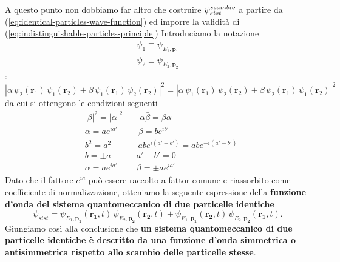A questo punto non dobbiamo far altro che costruire $ \mathlarger{\psi}^{scambio}_{sist}$
a partire da (\ref{eq:identical-particles-wave-function}) ed imporre la validità di (\ref{eq:indistinguishable-particles-principle})\sidenote
{
Introduciamo la notazione
\begin{gather*}
    \psi_1 \equiv \psi_{E_1,\bm{p}_1} \\
    \psi_2 \equiv \psi_{E_2,\bm{p}_2}
\end{gather*}
}:
\[
    |\alpha\, \psi_2(\bm{r}_1)\,\psi_1(\bm{r}_2) + \beta\, \psi_1(\bm{r}_1)\,\psi_2(\bm{r}_2)|^2 =
    |\alpha\, \psi_1(\bm{r}_1)\,\psi_2(\bm{r}_2) + \beta\, \psi_2(\bm{r}_1)\,\psi_1(\bm{r}_2)|^2
\]
da cui si ottengono le condizioni seguenti
\begin{align*}
    &|\beta|^{2} = |\alpha|^{2} \qquad \alpha \bar{\beta} = \beta \bar{\alpha}  \\
    &\alpha = ae^{ ia' } \quad \ \  \quad  \beta = b e^{ ib' }  \\
    &b^{2} = a^{2} \qquad \quad \, ab e^{ i(a'-b') } = abe^{ -i(a'-b') } \\
    &b = \pm a \qquad \quad a'-b'=0 \\
    &\alpha = a e^{ ia' } \qquad \ \beta = \pm ae^{ ia' }
\end{align*}
Dato che il fattore $ e^{ia}$ può essere raccolto a fattor comune e riassorbito come
coefficiente di normalizzazione, otteniamo la seguente espressione della \textbf{funzione d’onda del sistema quantomeccanico
di due particelle identiche}
\begin{equation}
    \psi_{sist} = \psi_{E_1, \bm{p_1}} (\bm{r_1}, t) \, \psi_{E_2, \bm{p_2}} (\bm{r_2}, t) \pm \psi_{E_1, \bm{p_1}} (\bm{r_2}, t) \, \psi_{E_2, \bm{p_2}} (\bm{r_1}, t).
    \label{eq:identical-particles-wave-function}
\end{equation}
Giungiamo così alla conclusione che \textbf{un sistema quantomeccanico di due particelle identiche è descritto da una funzione
d’onda simmetrica o antisimmetrica rispetto allo scambio delle particelle stesse}.

